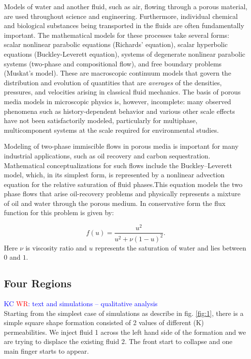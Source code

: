 \documentclass[preprint,authoryear,12pt]{elsarticle}
\begin{document}
Models of water and another fluid, such as air, flowing through a
porous material, are used throughout science and
engineering.  Furthermore, individual chemical and biological
substances being transported in the fluids are often fundamentally
important. The mathematical models for these processes take several forms: scalar nonlinear parabolic equations (Richards' equation), scalar hyperbolic equations (Buckley-Leverett equation), systems of degenerate nonlinear parabolic systems (two-phase and compositional flow), and free boundary problems (Muskat's model). These are macroscopic continuum models that govern the distribution and evolution of quantities that are {\em averages} of the densities, pressures, and velocities arising in classical fluid mechanics. The basis of porous media models in microscopic physics is, however, incomplete: many observed phenomena such as history-dependent behavior and various other scale effects have not been satisfactorily modeled, particularly for multiphase,
multicomponent systems at the scale required for environmental
studies.

Modeling of two-phase immiscible flows in porous media is
important for many industrial applications, such as oil recovery and carbon sequestration. Mathematical conceptualizations for such flows include the Buckley–Leverett model, which, in its simplest form, is represented by a nonlinear advection equation for the relative saturation of fluid phases.This equation models the two phase flows that arise oil-recovery problems and physically
represents a mixture of oil and water through the porous medium.
In conservative form the flux function for this
problem is given by:

\begin{equation}
f(u) = \frac{u^2}{u^2 + \nu(1-u)^2}. \label{buckley}
\end{equation}
Here $\nu$ is viscosity ratio and $u$ represents the saturation of water and
lies between $0$ and $1$.

\subsection{Four Regions}\label{section:4Regions}
\textcolor{blue}{KC \textcolor{red}{WR}: text and simulations -- qualitative analysis}\\

Starting from the simplest case of simulations as describe in fig. \ref{fig:1}, there is a simple square shape formation consisted of 2 values of different (K) permeabilities. We inject fluid 1 across the left hand side of the formation and we are trying to displace the existing fluid 2. The front start to collapse and one main finger starts to appear.
\end{document}
